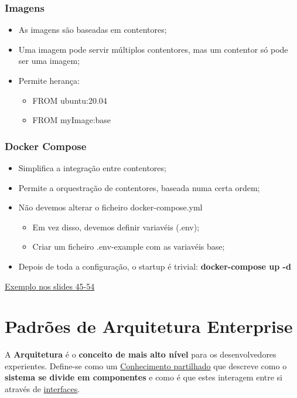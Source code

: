 \documentclass{article}
\begin{document}
\subsubsection{Imagens}

\begin{itemize}
  \item As imagens são baseadas em contentores;
  \item Uma imagem pode servir múltiplos contentores, mas um contentor
  só pode ser uma imagem;
  \item Permite herança:
  \begin{itemize}
    \item FROM ubuntu:20.04
    \item FROM myImage:base
  \end{itemize}
\end{itemize}

\subsubsection{Docker Compose}

\begin{itemize}
  \item Simplifica a integração entre contentores;
  \item Permite a orquestração de contentores, baseada numa certa ordem;
  \item Não devemos alterar o ficheiro docker-compose.yml
  \begin{itemize}
    \item Em vez disso, devemos definir variavéis (.env);
    \item Criar um ficheiro .env-example com as variavéis base;
  \end{itemize}

  \item Depois de toda a configuração, o startup é trivial: \textbf{docker-compose up -d}
\end{itemize}

\uline{Exemplo nos slides 45-54}

\pagebreak

\section{Padrões de Arquitetura Enterprise}

A \textbf{Arquitetura} é o \textbf{conceito de mais alto nível} para
os desenvolvedores experientes. Define-se como um \uline{Conhecimento
partilhado} que descreve como o \textbf{sistema se divide em componentes}
e como é que estes interagem entre si através de \uline{interfaces}.
\end{document}
